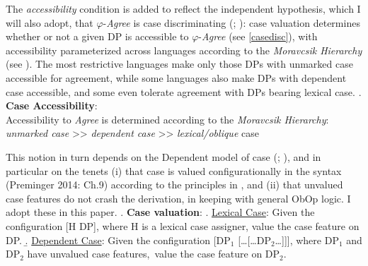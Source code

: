 \documentclass[11pt, letterpaper]{paper_nick}
\begin{document}
The \emph{accessibility} condition is added to reflect the independent hypothesis, which I will also adopt, that $\varphi$-\emph{Agree} is case discriminating (\citealt{bobaljik08}; \citealt{preminger14}): case valuation determines whether or not a given DP is accessible to $\varphi$-\emph{Agree} (see \ref{casedisc}), with accessibility parameterized across languages according to the \emph{Moravcsik Hierarchy} (see \Next[b]). The most restrictive languages make only those DPs with unmarked case accessible for agreement, while some languages also make DPs with dependent case accessible, and some even tolerate agreement with DPs bearing lexical case.
\ex. \textbf{Case Accessibility}:\\
Accessibility to \emph{Agree} is determined according to the \emph{Moravcsik Hierarchy}:\\
\emph{unmarked case} >> \emph{dependent case} >> \emph{lexical/oblique} case

This notion in turn depends on the Dependent model of case (\citealt{marantz84}; \citealt{bobaljik08}), and in particular on the tenets (i) that case is valued configurationally in the syntax (Preminger 2014: Ch.9) according to the principles in \Next, and (ii) that unvalued case features do not crash the derivation, in keeping with general ObOp logic. I adopt these in this paper. 
\ex. \textbf{Case valuation}:
\a. \underline{Lexical Case}: Given the configuration [H DP], where H is a lexical case assigner, value the case feature on DP. 
\b. \underline{Dependent Case}: Given the configuration [DP$_1$ [\ldots[\ldots DP$_2$\ldots]]], where DP$_1$ and DP$_2$ have unvalued case features,\footnotemark\ value the case feature on DP$_2$. 

\end{document}
